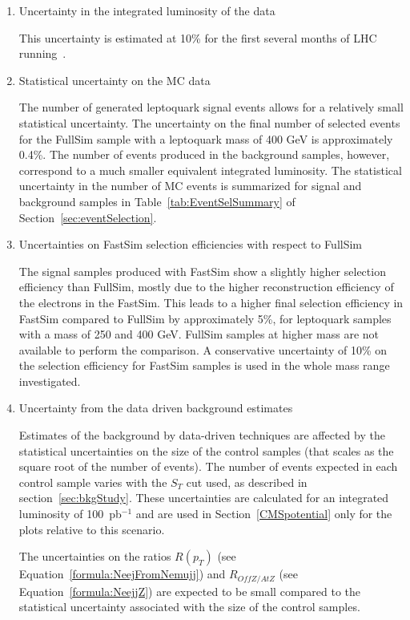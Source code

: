 \begin{enumerate}
\item Uncertainty in the integrated luminosity of the data

This uncertainty is estimated at 10\% for the first several months of LHC running~\cite{Ball:2007zza}. 
%
\item Statistical uncertainty on the MC data

The number of generated leptoquark signal events allows for a relatively small statistical uncertainty.
The uncertainty on the final number of selected events for the FullSim sample with a leptoquark mass of 400 GeV is 
approximately 0.4\%.  The number of events produced in the background samples, however, correspond to a much
smaller equivalent integrated luminosity.  
The statistical uncertainty in the number of MC events is summarized for signal and background samples 
in Table~\ref{tab:EventSelSummary} of Section~\ref{sec:eventSelection}.  
%
\item Uncertainties on FastSim selection efficiencies with respect to FullSim

The signal samples produced with FastSim show a slightly higher selection efficiency than FullSim, 
mostly due to the higher reconstruction efficiency of the electrons in the FastSim. 
This leads to a higher final selection efficiency in FastSim compared to FullSim by approximately 5\%, 
for leptoquark samples with a mass of 250 and 400 GeV. FullSim samples at higher mass are not available 
to perform the comparison. A conservative uncertainty of 10\% on the selection efficiency 
for FastSim samples is used in the whole mass range investigated. 
%
\item Uncertainty from the data driven background estimates

Estimates of the background by data-driven techniques are affected by the statistical
uncertainties on the size of the control samples (that scales as the square root of the number of events).
The number of events expected in each control sample varies with the $S_T$ cut used, as 
described in section~\ref{sec:bkgStudy}. 
These uncertainties are calculated for an integrated luminosity of 100~pb$^{-1}$ 
and are used in Section~\ref{CMSpotential} only for the plots relative to this scenario.

The uncertainties on the ratios $R(p_{T})$ (see Equation~\ref{formula:NeejFromNemujj})
and $R_{OffZ/AtZ}$ (see Equation~\ref{formula:NeejjZ})
are expected to be small compared to the statistical uncertainty 
associated with the size of the control samples.


\end{enumerate}

